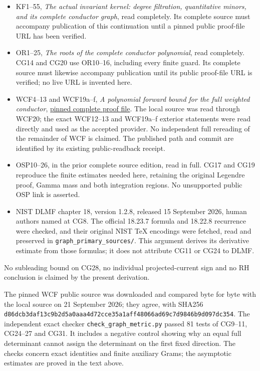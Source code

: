 \documentclass[11pt]{article}
\providecommand{\tightlist}{}
\begin{document}
\begin{itemize}
\tightlist
\item
  KF1--55, \emph{The actual invariant kernel: degree filtration, quantitative minors, and its complete conductor graph}, read completely. Its complete source must accompany publication of this continuation until a pinned public proof-file URL has been verified.
\item
  OR1--25, \emph{The roots of the complete conductor polynomial}, read completely. CG14 and CG20 use OR10--16, including every finite guard. Its complete source must likewise accompany publication until its public proof-file URL is verified; no live URL is invented here.
\item
  WCF4--13 and WCF19a--f, \emph{A polynomial forward bound for the full weighted conductor}, \href{https://github.com/KokunoYumeto/zeta-function-research-reader/blob/52274804051e325c8a6ef69c17b3958cc2caba0a/workbenches/splitzero-tandem/continuations/20260920-gamma-and-finite-derivative/providers/WEIGHTED_CONDUCTOR_FORWARD.tex}{pinned complete proof file}. The local source was read through WCF20; the exact WCF12--13 and WCF19a--f exterior statements were read directly and used as the accepted provider. No independent full rereading of the remainder of WCF is claimed. The published path and commit are identified by its existing public-readback receipt.
\item
  OSP10--26, in the prior complete source edition, read in full. CG17 and CG19 reproduce the finite estimates needed here, retaining the original Legendre proof, Gamma mass and both integration regions. No unsupported public OSP link is asserted.
\item
  NIST DLMF chapter 18, version 1.2.8, released 15 September 2026, human authors named at CG8. The official 18.23.7 formula and 18.22.8 recurrence were checked, and their original NIST TeX encodings were fetched, read and preserved in \nolinkurl{graph_primary_sources/}. This argument derives its derivative estimate from those formulas; it does not attribute CG11 or CG24 to DLMF.
\end{itemize}

No subleading bound on CG28, no individual projected-current sign and no RH conclusion is claimed by the present derivation.

The pinned WCF public source was downloaded and compared byte for byte with the local source on 21 September 2026; they agree, with SHA256 \nolinkurl{d86dcb3daf13c9b2d5a0aaa4d72cce35a1aff48066ad69c7d9846b9d097dc354}. The independent exact checker \nolinkurl{check_graph_metric.py} passed 81 tests of CG9--11, CG24--27 and CG31. It includes a negative control showing why an equal full determinant cannot assign the determinant on the first fixed direction. The checks concern exact identities and finite auxiliary Grams; the asymptotic estimates are proved in the text above.
\end{document}

